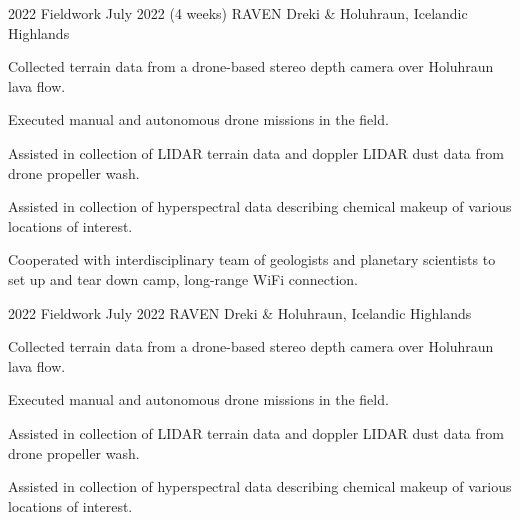 

\begin{cventries}

	\cventry
	{2022 Fieldwork} %
	{July 2022 (4 weeks)} %
	{RAVEN} %
	{Dreki \& Holuhraun, Icelandic Highlands} %
	{
	\begin{cvitems}
		\item Collected terrain data from a drone-based stereo depth camera over Holuhraun lava flow.
		\item Executed manual and autonomous drone missions in the field.
		\item Assisted in collection of LIDAR terrain data and doppler LIDAR dust data from drone propeller wash.
		\item Assisted in collection of hyperspectral data describing chemical makeup of various locations of interest.
		\item Cooperated with interdisciplinary team of geologists and planetary scientists to set up and tear down camp, long-range WiFi connection.
	\end{cvitems}
	}  

	\cventry
	{2022 Fieldwork} %
	{July 2022} %
	{RAVEN} %
	{Dreki \& Holuhraun, Icelandic Highlands} %
	{
	\begin{cvitems}
		\item Collected terrain data from a drone-based stereo depth camera over Holuhraun lava flow.
		\item Executed manual and autonomous drone missions in the field.
		\item Assisted in collection of LIDAR terrain data and doppler LIDAR dust data from drone propeller wash.
		\item Assisted in collection of hyperspectral data describing chemical makeup of various locations of interest.
	\end{cvitems}
	}  


\end{cventries}

